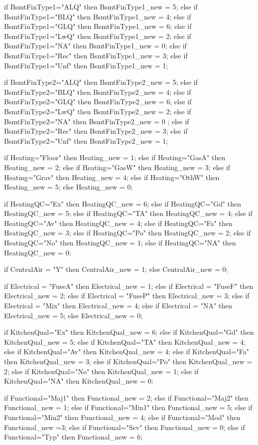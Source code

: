 		if BsmtFinType1="ALQ" then BsmtFinType1_new = 5;
		else if BsmtFinType1="BLQ" then BsmtFinType1_new = 4;
		else if BsmtFinType1="GLQ" then BsmtFinType1_new = 6;
		else if BsmtFinType1="LwQ" then BsmtFinType1_new = 2;
		else if BsmtFinType1="NA" then BsmtFinType1_new = 0;
		else if BsmtFinType1="Rec" then BsmtFinType1_new = 3;
		else if BsmtFinType1="Unf" then BsmtFinType1_new = 1;
		

		if BsmtFinType2="ALQ" then BsmtFinType2_new = 5;
		else if BsmtFinType2="BLQ" then BsmtFinType2_new = 4;
		else if BsmtFinType2="GLQ" then BsmtFinType2_new = 6;
		else if BsmtFinType2="LwQ" then BsmtFinType2_new = 2;
		else if BsmtFinType2="NA" then BsmtFinType2_new = 0 ;
		else if BsmtFinType2="Rec" then BsmtFinType2_new = 3;
		else if BsmtFinType2="Unf" then BsmtFinType2_new = 1;


		if Heating="Floor" then Heating_new = 1;
		else if Heating="GasA" then Heating_new = 2;
		else if Heating="GasW" then Heating_new = 3;
		else if Heating="Grav" then Heating_new = 4;
		else if Heating="OthW" then Heating_new = 5;
		else  Heating_new = 0;
		
		if HeatingQC="Ex" 		then HeatingQC_new = 6;
		else if HeatingQC="Gd" 	then HeatingQC_new = 5;
		else if HeatingQC="TA" 	then HeatingQC_new = 4;
		else if HeatingQC="Av" 	then HeatingQC_new = 4;
		else if HeatingQC="Fa" 	then HeatingQC_new = 3;
		else if HeatingQC="Po" 	then HeatingQC_new = 2;
		else if HeatingQC="No" 	then HeatingQC_new = 1;
		else if HeatingQC="NA" 	then HeatingQC_new = 0;

		
		if CentralAir = "Y" then CentralAir_new = 1;
		else CentralAir_new = 0;

		if Electrical = "FuseA" then Electrical_new = 1;
		else if Electrical = "FuseF" then Electrical_new = 2;
		else if Electrical = "FuseP" then Electrical_new = 3;
		else if Electrical = "Mix" then Electrical_new = 4;
		else if Electrical = "NA" then Electrical_new = 5;
		else Electrical_new = 0;

		if KitchenQual="Ex" 		then KitchenQual_new = 6;
		else if KitchenQual="Gd" 	then KitchenQual_new = 5;
		else if KitchenQual="TA" 	then KitchenQual_new = 4;
		else if KitchenQual="Av" 	then KitchenQual_new = 4;
		else if KitchenQual="Fa" 	then KitchenQual_new = 3;
		else if KitchenQual="Po" 	then KitchenQual_new = 2;
		else if KitchenQual="No" 	then KitchenQual_new = 1;
		else if KitchenQual="NA" 	then KitchenQual_new = 0;


		if Functional="Maj1" then Functional_new = 2;
		else if Functional="Maj2" then Functional_new = 1;
		else if Functional="Min1" then Functional_new = 5;
		else if Functional="Min2" then Functional_new = 4;
		else if Functional="Mod" then Functional_new =3;
		else if Functional="Sev" then Functional_new = 0;
		else if Functional="Typ" then Functional_new = 6;

